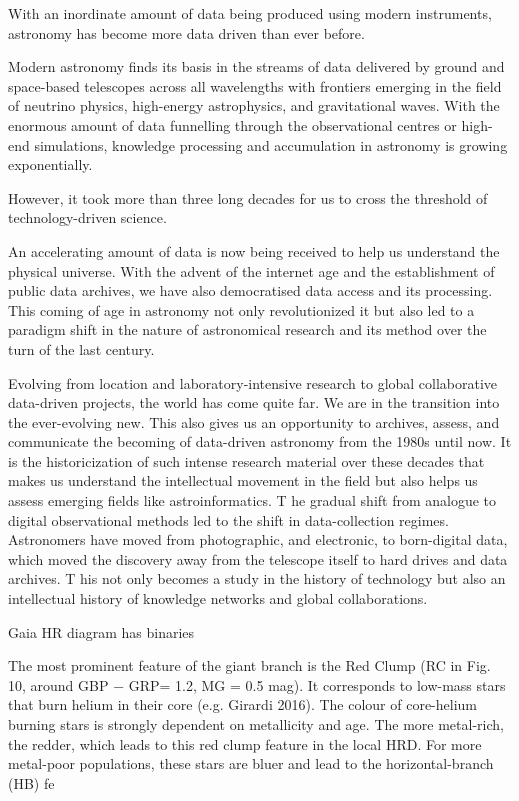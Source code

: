 With an inordinate amount of data being produced using modern instruments, astronomy has become more data driven than ever before.


Modern astronomy finds its basis in the streams of data delivered by ground and space-based telescopes across all wavelengths with frontiers emerging in the field of neutrino physics, high-energy astrophysics, and gravitational waves.
With the enormous amount of data funnelling through the observational centres or high-end simulations, knowledge processing and accumulation in astronomy is growing exponentially.

However, it took more than three long decades for us to cross the threshold of technology-driven science.



An accelerating amount of data is now being received to help us understand the physical universe. With the advent of the internet age and the establishment of public data archives, we have also democratised data access and its processing. This coming of age in astronomy not only revolutionized it but also led to a paradigm shift in the nature of astronomical research and its method over the turn of the last century.



Evolving from location and laboratory-intensive research to global collaborative data-driven projects, the world has come quite far.  We are in the transition into the ever-evolving new. This also gives us an opportunity to archives, assess, and communicate the becoming of data-driven astronomy from the 1980s until now. It is the historicization of such intense research material over these decades that makes us understand the intellectual movement in the field but also helps us assess emerging fields like astroinformatics.  T
he gradual shift from analogue to digital observational methods led to the shift in data-collection regimes.
Astronomers have moved from photographic, and electronic, to born-digital data, which moved the discovery away from the telescope itself to hard drives and data archives. T
his not only becomes a study in the history of technology but also an intellectual history of knowledge networks and global collaborations.



Gaia HR diagram has binaries


The most prominent feature of the giant branch is the Red
Clump (RC in Fig. 10, around GBP − GRP= 1.2, MG = 0.5 mag).
It corresponds to low-mass stars that burn helium in their core
(e.g. Girardi 2016). The colour of core-helium burning stars is
strongly dependent on metallicity and age. The more metal-rich,
the redder, which leads to this red clump feature in the local
HRD. For more metal-poor populations, these stars are bluer and
lead to the horizontal-branch (HB) fe


